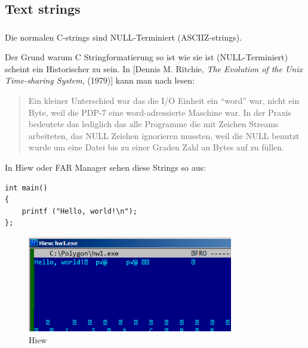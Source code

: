 \subsection{Text strings}

\subsubsection{\CCpp}

\label{C_strings}

Die normalen C-strings sind NULL-Terminiert (\ac{ASCIIZ}-strings).

Der Grund warum C Stringformatierung so ist wie sie ist (NULL-Terminiert) scheint ein Historischer zu sein.
In [Dennis M. Ritchie, \emph{The Evolution of the Unix Time-sharing System}, (1979)] kann man nach lesen:

\begin{framed}
\begin{quotation}
Ein kleiner Unterschied war das die I/O Einheit ein ``word'' war, nicht ein Byte, weil die PDP-7 eine word-adressierte
Maschine war. In der Praxis bedeutete das lediglich das alle Programme die mit Zeichen Streams arbeiteten, das NULL 
Zeichen ignorieren mussten, weil die NULL benutzt wurde um eine Datei bis zu einer Graden Zahl an Bytes auf zu f\"ullen.

\end{quotation}
\end{framed}


In Hiew oder FAR Manager sehen diese Strings so aus:

\begin{lstlisting}[style=customc]
int main()
{
	printf ("Hello, world!\n");
};
\end{lstlisting}

\begin{figure}[H]
\centering
\includegraphics[width=0.8\textwidth]{digging_into_code/strings/C-string.png}
\caption{Hiew}
\end{figure}

